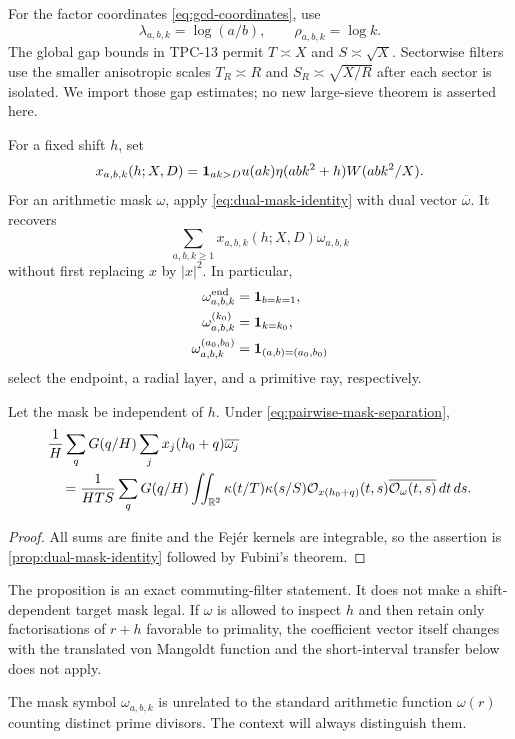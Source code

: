 For the factor coordinates \eqref{eq:gcd-coordinates}, use
\begin{equation}
 \lambda_{a,b,k}=\log(a/b),
 \qquad
 \rho_{a,b,k}=\log k.
 \label{eq:gcd-mellin-frequencies}
\end{equation}
The global gap bounds in TPC-13 permit
$T\asymp X$ and $S\asymp\sqrt X$.  Sectorwise filters use the smaller
anisotropic scales $T_R\asymp R$ and $S_R\asymp\sqrt{X/R}$ after each
sector is isolated.  We import those gap estimates; no new large-sieve
theorem is asserted here.

For a fixed shift $h$, set
\begin{equation}
 x_{a,b,k}(h;X,D)=
 \mathbf 1_{ak>D}u(ak)\eta(abk^2+h)W(abk^2/X).
 \label{eq:arithmetic-joint-coefficient}
\end{equation}
For an arithmetic mask $\omega$, apply
\eqref{eq:dual-mask-identity} with dual vector $\overline\omega$.  It
recovers
\begin{equation}
 \sum_{a,b,k\geq1}x_{a,b,k}(h;X,D)
 \omega_{a,b,k}
 \label{eq:masked-linear-functional}
\end{equation}
without first replacing $x$ by $|x|^2$.  In particular,
\begin{align}
 \omega^{\rm end}_{a,b,k}&=\mathbf 1_{b=k=1},
 \label{eq:endpoint-mask}\\
 \omega^{(k_0)}_{a,b,k}&=\mathbf 1_{k=k_0},
 \label{eq:radial-layer-mask}\\
 \omega^{(a_0,b_0)}_{a,b,k}&=\mathbf 1_{(a,b)=(a_0,b_0)}
 \label{eq:ray-mask}
\end{align}
select the endpoint, a radial layer, and a primitive ray, respectively.

\begin{proposition}
\label{prop:selector-translation-commutation}
Let the mask be independent of $h$.  Under
\eqref{eq:pairwise-mask-separation},
\begin{align}
 &\frac1H\sum_qG(q/H)
 \sum_jx_j(h_0+q)\overline{\omega_j}
 \notag\\
 &\quad={}
 \frac1{HTS}\sum_qG(q/H)
 \iint_{\mathbb R^2}\kappa(t/T)\kappa(s/S)
 \mathcal O_{x(h_0+q)}(t,s)
 \overline{\mathcal O_\omega(t,s)}\,dt\,ds.
 \label{eq:translation-mask-commutation}
\end{align}
\end{proposition}

\begin{proof}
All sums are finite and the Fej\'er kernels are integrable, so the assertion
is \cref{prop:dual-mask-identity} followed by Fubini's theorem.
\end{proof}

The proposition is an exact commuting-filter statement.  It does not make a
shift-dependent target mask legal.  If $\omega$ is allowed to inspect
$h$ and then retain only factorisations of $r+h$ favorable to primality,
the coefficient vector itself changes with the translated von Mangoldt
function and the short-interval transfer below does not apply.

The mask symbol $\omega_{a,b,k}$ is unrelated to the standard arithmetic
function $\omega(r)$ counting distinct prime divisors.  The context will
always distinguish them.
